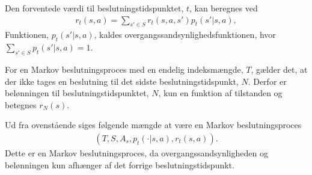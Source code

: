 Den forventede værdi til beslutningstidspunktet, $t$, kan beregnes ved 
\begin{align*}
    r_t(s,a)=\sum_{s'\in S} r_t(s,a,s')p_t(s' | s,a),
\end{align*}
%
%
%
%
Funktionen, $p_t(s'|s,a)$, kaldes overgangssandsynlighedsfunktionen, hvor $\displaystyle\sum_{s'\in S} p_t(s'|s,a)=1$.


For en Markov beslutningsproces med en endelig indeksmængde, $T$, gælder det, at der ikke tages en beslutning til det sidste beslutningstidspunkt, $N$. Derfor er belønningen til beslutningstidspunktet, $N$, kun en funktion af tilstanden og betegnes $r_N(s)$.

Ud fra ovenstående siges følgende mængde at være en Markov beslutningsproces
%
\begin{align*}
    \left(T, S, A_s, p_t(\cdot | s,a), r_t(s,a)\right).
 \end{align*}
Dette er en Markov beslutningsproces, da overgangssandsynligheden og belønningen kun afhænger af det forrige beslutningstidspunkt. 




